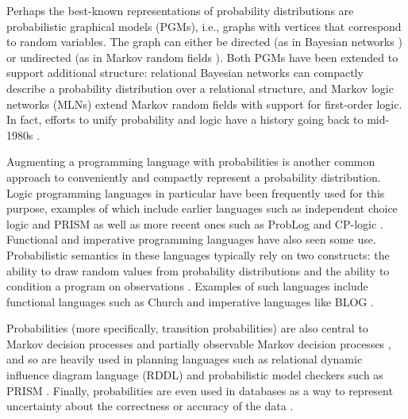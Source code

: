 \documentclass{article}
\begin{document}
Perhaps the best-known representations of probability distributions are
probabilistic graphical models (PGMs), i.e., graphs with vertices that
correspond to random variables. The graph can either be directed (as in Bayesian
networks \cite{DBLP:books/daglib/0066829}) or undirected (as in Markov random
fields \cite{spitzer1971markov}). Both PGMs have been extended to support
additional structure: relational Bayesian networks \cite{DBLP:conf/uai/Jaeger97}
can compactly describe a probability distribution over a relational structure,
and Markov logic networks (MLNs) \cite{DBLP:journals/ml/RichardsonD06} extend
Markov random fields with support for first-order logic. In fact, efforts to
unify probability and logic have a history going back to mid-1980s
\cite{DBLP:journals/ndjfl/Hailperin84,DBLP:journals/ai/Nilsson86}.

Augmenting a programming language with probabilities is another common approach
to conveniently and compactly represent a probability distribution. Logic
programming languages in particular have been frequently used for this purpose,
examples of which include earlier languages such as independent choice logic
\cite{DBLP:journals/ai/Poole97} and PRISM \cite{DBLP:conf/ijcai/SatoK97} as well
as more recent ones such as ProbLog \cite{DBLP:conf/ijcai/RaedtKT07} and
CP-logic \cite{DBLP:journals/tplp/VennekensDB09}. Functional and imperative
programming languages have also seen some use. Probabilistic semantics in these
languages typically rely on two constructs: the ability to draw random values
from probability distributions and the ability to condition a program on
observations \cite{DBLP:conf/icse/GordonHNR14}. Examples of such languages
include functional languages such as Church \cite{DBLP:conf/uai/GoodmanMRBT08}
and imperative languages like BLOG \cite{DBLP:conf/ijcai/MilchMRSOK05}.

Probabilities (more specifically, transition probabilities) are also central to
Markov decision processes \cite{bellman1957markovian} and partially observable
Markov decision processes \cite{aastrom1965optimal}, and so are heavily used in
planning languages such as relational dynamic influence diagram language (RDDL)
\cite{sanner2010relational} and probabilistic model checkers such as PRISM
\cite{DBLP:conf/cav/KwiatkowskaNP11}. Finally, probabilities are even used in
databases as a way to represent uncertainty about the correctness or accuracy of
the data \cite{DBLP:series/synthesis/2011Suciu}.
\end{document}
